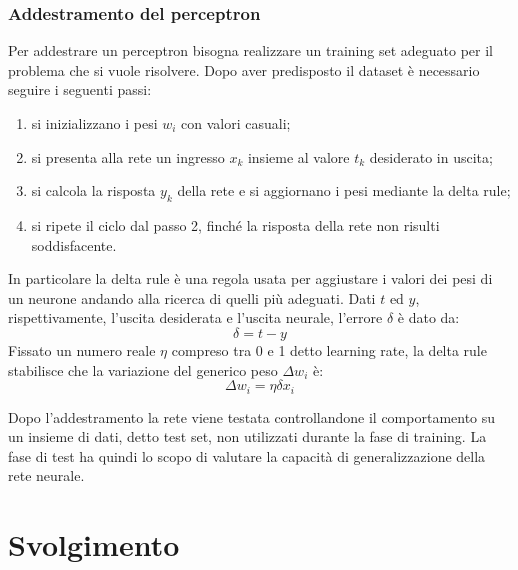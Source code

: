 \documentclass[a4paper,11pt]{article}
\begin{document}
    \newpage
    \subsubsection{Addestramento del perceptron}
    Per addestrare un perceptron bisogna realizzare un training set adeguato per il problema che si vuole risolvere. 
    Dopo aver predisposto il dataset è necessario seguire i seguenti passi:
    \begin{enumerate}
        \item si inizializzano i pesi $w_i$ con valori casuali;
        \item si presenta alla rete un ingresso $x_k$ insieme al valore $t_k$ desiderato in uscita;
        \item si calcola la risposta $y_k$ della rete e si aggiornano i pesi mediante la delta rule;
        \item si ripete il ciclo dal passo 2, finché la risposta della rete non risulti soddisfacente.
    \end{enumerate}

    In particolare la delta rule è una regola usata per aggiustare i valori dei pesi di un neurone andando alla ricerca di quelli più adeguati.
    Dati $t$ ed $y$, rispettivamente, l'uscita desiderata e l'uscita neurale, l'errore $\delta$ è dato da:
    $$ \delta = t-y $$
    Fissato un numero reale $\eta$ compreso tra 0 e 1 detto learning rate, la delta rule stabilisce che la variazione del generico peso $\Delta w_i$ è:
    $$ \Delta w_i = \eta \delta x_i $$

    Dopo l’addestramento la rete viene testata controllandone il comportamento su un insieme di dati, detto test set, non utilizzati durante la fase di training. La fase di test ha quindi lo scopo 
    di valutare la capacità di generalizzazione della rete neurale.

  
    \newpage

    \section{Svolgimento}
\end{document}
